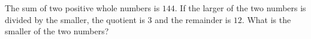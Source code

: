 The sum of two positive whole numbers is $144$. If the larger of the two numbers is divided by the smaller, the quotient is $3$ and the remainder is $12$. What is the smaller of the two numbers?
